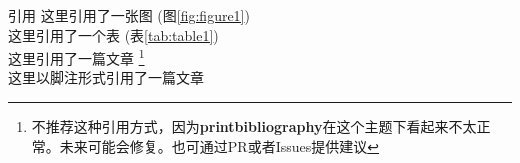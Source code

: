 \documentclass{beamer}
\begin{document}
    \begin{frame}{引用}
        这里引用了一张图 (图\ref{fig:figure1})\\
        这里引用了一个表 (表\ref{tab:table1})\\
        这里引用了一篇文章 \cite{vaswani2017attention}\footnote{不推荐这种引用方式，因为\textbf{printbibliography}在这个主题下看起来不太正常。未来可能会修复。也可通过PR或者Issues提供建议 }\\
        这里以脚注形式引用了一篇文章 
    \end{frame}


    \printbibliography[title={参考文献},heading=bibnumbered]
\end{document}
